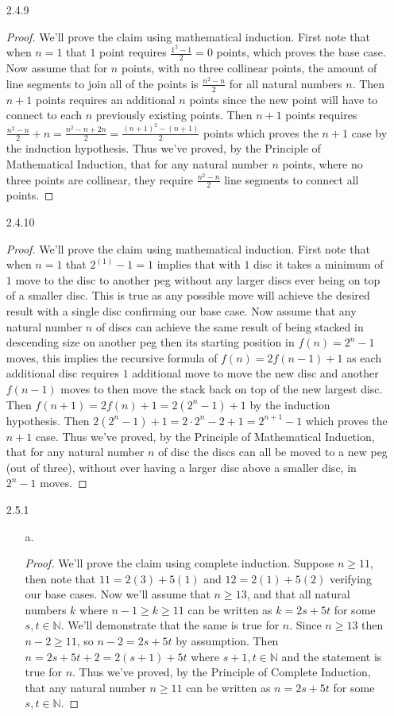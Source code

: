 \documentclass[11pt]{amsart}
\theoremstyle{definition}
\begin{document}
\begin{itemize}
\item[2.4.9]\begin{proof}
    We’ll prove the claim using mathematical induction. First note that when $n=1$ that $1$ point requires $\frac{1^2-1}2=0$ points, which proves the base case. Now assume that for $n$ points, with no three collinear points, the amount of line segments to join all of the points is $\frac{n^2-n}2$ for all natural numbers $n$. Then $n+1$ points requires an additional $n$ points since the new point will have to connect to each $n$ previously existing points. Then $n+1$ points requires $\frac{n^2-n}2+n=\frac{n^2-n+2n}2=\frac{(n+1)^2-(n+1)}2$ points which proves the $n+1$ case by the induction hypothesis. Thus we've proved, by the Principle of Mathematical Induction, that for any natural number $n$ points, where no three points are collinear, they require $\frac{n^2-n}2$ line segments to connect all points.
\end{proof}

\item[2.4.10]\begin{proof}
    We’ll prove the claim using mathematical induction. First note that when $n=1$ that $2^{(1)}-1=1$ implies that with $1$ disc it takes a minimum of $1$ move to the disc to another peg without any larger discs ever being on top of a smaller disc. This is true as any possible move will achieve the desired result with a single disc confirming our base case. Now assume that any natural number $n$ of discs can achieve the same result of being stacked in descending size on another peg then its starting position in $f(n)=2^n-1$ moves, this implies the recursive formula of $f(n)=2f(n-1)+1$ as each additional disc requires $1$ additional move to move the new disc and another $f(n-1)$ moves to then move the stack back on top of the new largest disc. Then $f(n+1)=2f(n)+1=2(2^n-1)+1$ by the induction hypothesis. Then $2(2^n-1)+1=2\cdot2^n-2+1=2^{n+1}-1$ which proves the $n+1$ case. Thus we've proved, by the Principle of Mathematical Induction, that for any natural number $n$ of disc the discs can all be moved to a new peg (out of three), without ever having a larger disc above a smaller disc, in $2^n-1$ moves.
\end{proof}

\item[2.5.1]
\begin{itemize}
    \item[a.]\begin{proof}
        We’ll prove the claim using complete induction. Suppose $n\ge 11$, then note that $11=2(3)+5(1)$ and $12=2(1)+5(2)$ verifying our base cases. Now we'll assume that $n\ge 13$, and that all natural numbers $k$ where $n-1\ge k\ge 11$ can be written as $k=2s+5t$ for some $s,t\in\mathbb{N}$. We'll demonstrate that the same is true for $n$. Since $n\ge 13$ then $n-2\ge 11$, so $n-2=2s+5t$ by assumption. Then $n=2s+5t+2=2(s+1)+5t$ where $s+1,t\in\mathbb{N}$ and the statement is true for $n$. Thus we've proved, by the Principle of Complete Induction, that any natural number $n\ge 11$ can be written as $n=2s+5t$ for some $s,t\in\mathbb{N}$.
    \end{proof}
    

\end{itemize}
\end{itemize}
\end{document}
